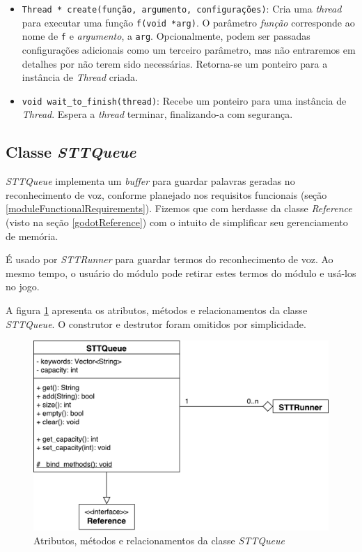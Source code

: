 \begin{itemize}
\item \texttt{Thread * create(função, argumento, configurações)}: Cria uma \textit{thread} para executar uma função \texttt{f(void *arg)}. O parâmetro \textit{função} corresponde ao nome de \texttt{f} e \textit{argumento}, a \texttt{arg}. Opcionalmente, podem ser passadas configurações adicionais como um terceiro parâmetro, mas não entraremos em detalhes por não terem sido necessárias. Retorna-se um ponteiro para a instância de \textit{Thread} criada.

\item \texttt{void wait\_to\_finish(thread)}: Recebe um ponteiro para uma instância de \textit{Thread}. Espera a \textit{thread} terminar, finalizando-a com segurança.
\end{itemize}


\subsection{Classe \textit{STTQueue}}

\textit{STTQueue} implementa um \textit{buffer} para guardar palavras geradas no reconhecimento de voz, conforme planejado nos requisitos funcionais (seção \ref{moduleFunctionalRequirements}). Fizemos que com herdasse da classe \textit{Reference} (visto na seção \ref{godotReference}) com o intuito de simplificar seu gerenciamento de memória.

É usado por \textit{STTRunner} para guardar termos do reconhecimento de voz. Ao mesmo tempo, o usuário do módulo pode retirar estes termos do módulo e usá-los no jogo.

A figura \ref{stt-queue} apresenta os atributos, métodos e relacionamentos da classe \textit{STTQueue}. O construtor e destrutor foram omitidos por simplicidade.

\begin{figure}[H]
  \centering
  \includegraphics[width=.8\textwidth]{image/stt-queue.pdf}
  \caption{Atributos, métodos e relacionamentos da classe \textit{STTQueue}}
  \label{stt-queue}
\end{figure}

